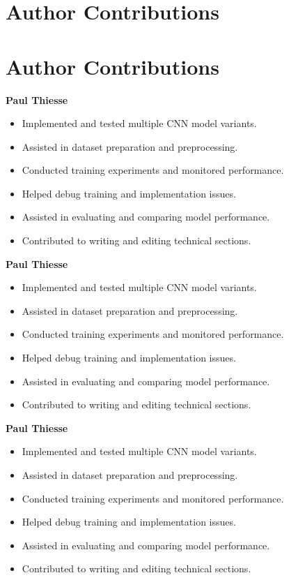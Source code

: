 \section*{Author Contributions}
\label{sec:contribs}

\section*{Author Contributions}

\noindent\textbf{Paul Thiesse}
\begin{itemize}[leftmargin=1.5em]
    \item Implemented and tested multiple CNN model variants.
    \item Assisted in dataset preparation and preprocessing.
    \item Conducted training experiments and monitored performance.
    \item Helped debug training and implementation issues.
    \item Assisted in evaluating and comparing model performance.
    \item Contributed to writing and editing technical sections.
\end{itemize}

\noindent\textbf{Paul Thiesse}
\begin{itemize}[leftmargin=1.5em]
    \item Implemented and tested multiple CNN model variants.
    \item Assisted in dataset preparation and preprocessing.
    \item Conducted training experiments and monitored performance.
    \item Helped debug training and implementation issues.
    \item Assisted in evaluating and comparing model performance.
    \item Contributed to writing and editing technical sections.
\end{itemize}

\noindent\textbf{Paul Thiesse}
\begin{itemize}[leftmargin=1.5em]
    \item Implemented and tested multiple CNN model variants.
    \item Assisted in dataset preparation and preprocessing.
    \item Conducted training experiments and monitored performance.
    \item Helped debug training and implementation issues.
    \item Assisted in evaluating and comparing model performance.
    \item Contributed to writing and editing technical sections.
\end{itemize}

